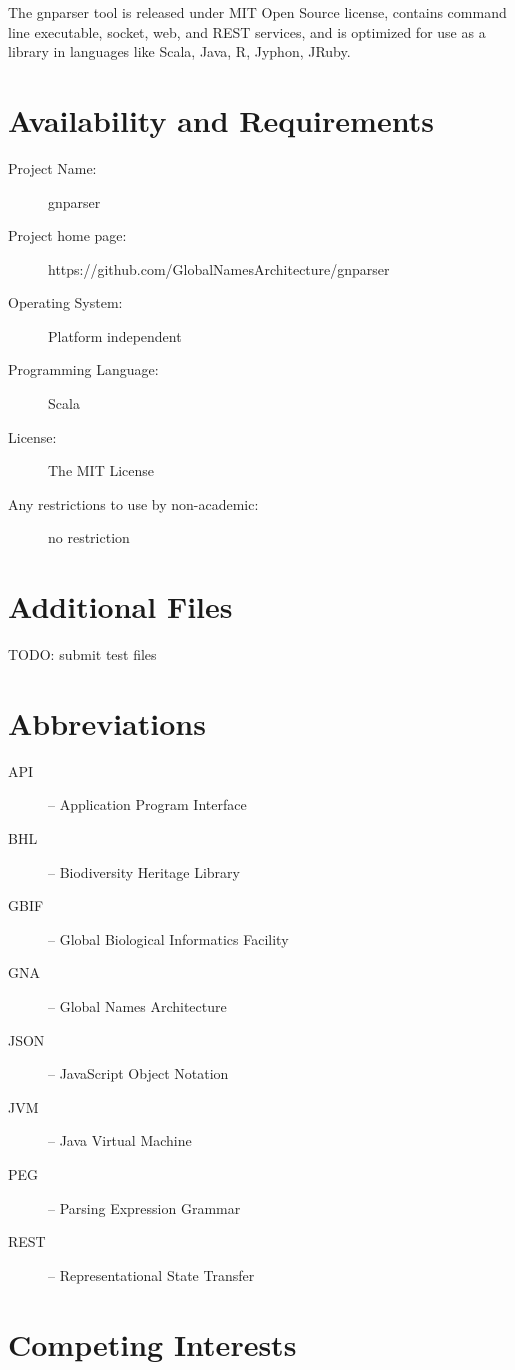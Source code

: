 \documentclass{bmcart}
\begin{document}
The gnparser tool is released under MIT Open Source license, contains command
line executable, socket, web, and REST services, and is optimized for use as a
library in languages like Scala, Java, R, Jyphon, JRuby.

\section*{Availability and Requirements}

\begin{description}
  \item[Project Name:] gnparser
  \item[Project home page:] https://github.com/GlobalNamesArchitecture/gnparser
  \item[Operating System:] Platform independent
  \item[Programming Language:] Scala
  \item[License:] The MIT License
  \item[Any restrictions to use by non-academic:] no restriction
\end{description}

\section*{Additional Files}

TODO: submit test files

\section*{Abbreviations}

\begin{description}
  \item[API] -- Application Program Interface
  \item[BHL] -- Biodiversity Heritage Library
  \item[GBIF] -- Global Biological Informatics Facility
  \item[GNA] -- Global Names Architecture
  \item[JSON] -- JavaScript Object Notation
  \item[JVM] -- Java Virtual Machine
  \item[PEG] -- Parsing Expression Grammar
  \item[REST] -- Representational State Transfer
\end{description}

\section*{Competing Interests}
\end{document}
